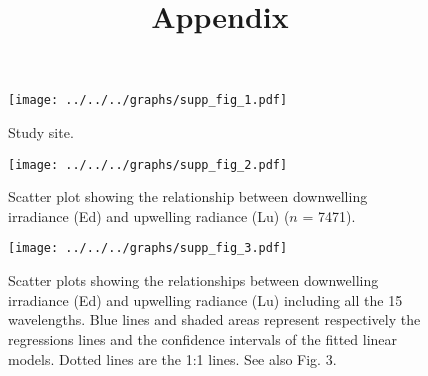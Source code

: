 \documentclass[12pt,a4paper]{scrartcl}
\title{Appendix}
\date{}
\begin{document}
    \maketitle

    \begin{figure}[h]
        \centering
        \texttt{[image: ../../../graphs/supp\_fig\_1.pdf]}
        \caption{Study site.}
    \end{figure}

    \clearpage
    \newpage

    \begin{figure}[h]
        \centering
        \texttt{[image: ../../../graphs/supp\_fig\_2.pdf]}
        \caption{Scatter plot showing the relationship between downwelling irradiance (Ed) and upwelling radiance (Lu) ($n$ = 7471).}
    \end{figure}

    \clearpage
    \newpage

    \begin{figure}[h]
        \centering
        \texttt{[image: ../../../graphs/supp\_fig\_3.pdf]}
        \caption{Scatter plots showing the relationships between downwelling irradiance (Ed) and upwelling radiance (Lu) including all the 15 wavelengths. Blue lines and shaded areas represent respectively the regressions lines and the confidence intervals of the fitted linear models. Dotted lines are the 1:1 lines. See also Fig. 3.}
    \end{figure}

    
\end{document}
